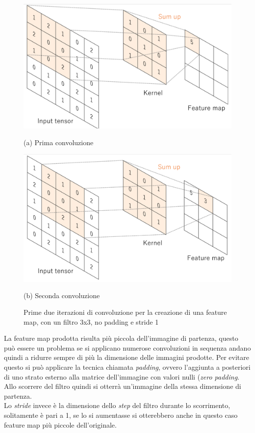\documentclass[12pt,a4paper,openright,twoside]{report}
\begin{document}
\begin{figure}[h]
\begin{minipage}[t]{0.49\linewidth}
\centering
\includegraphics[width=\linewidth]{filtera.png}

(a) Prima convoluzione  
\end{minipage}%
\hfill\vrule\hfill
\begin{minipage}[t]{0.49\linewidth}
\centering
\includegraphics[width=\linewidth]{filterb.png}

(b) Seconda convoluzione
\end{minipage}
\caption{Prime due iterazioni di convoluzione per la creazione di una feature map, con un filtro 3x3, no padding e stride 1}
\end{figure}
La feature map prodotta risulta più piccola dell'immagine di partenza, questo può essere un problema se si applicano numerose convoluzioni in sequenza andano quindi a ridurre sempre di più la dimensione delle immagini prodotte. Per evitare questo si può applicare la tecnica chiamata \emph{padding}, ovvero l'aggiunta a  posteriori di uno strato esterno alla matrice dell'immagine con valori nulli (\emph{zero padding}. Allo scorrere del filtro quindi si otterrà un'immagine della stessa dimensione di partenza.\\
Lo \emph{stride} invece è la dimensione dello \emph{step} del filtro durante lo scorrimento, solitamente è pari a 1, se lo si aumentasse si otterebbero anche in questo caso feature map più piccole dell'originale.
\end{document}

